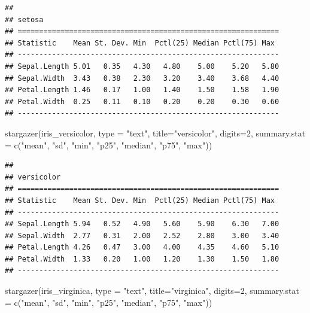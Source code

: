\documentclass[
]{book}
\newenvironment{Shaded}{\begin{snugshade}}{\end{snugshade}}
\newcommand{\AttributeTok}[1]{\textcolor[rgb]{0.77,0.63,0.00}{#1}}
\newcommand{\DecValTok}[1]{\textcolor[rgb]{0.00,0.00,0.81}{#1}}
\newcommand{\FunctionTok}[1]{\textcolor[rgb]{0.00,0.00,0.00}{#1}}
\newcommand{\NormalTok}[1]{#1}
\newcommand{\StringTok}[1]{\textcolor[rgb]{0.31,0.60,0.02}{#1}}
\begin{document}
\begin{verbatim}
## 
## setosa
## =============================================================
## Statistic    Mean St. Dev. Min  Pctl(25) Median Pctl(75) Max 
## -------------------------------------------------------------
## Sepal.Length 5.01   0.35   4.30   4.80    5.00    5.20   5.80
## Sepal.Width  3.43   0.38   2.30   3.20    3.40    3.68   4.40
## Petal.Length 1.46   0.17   1.00   1.40    1.50    1.58   1.90
## Petal.Width  0.25   0.11   0.10   0.20    0.20    0.30   0.60
## -------------------------------------------------------------
\end{verbatim}

\begin{Shaded}
\begin{Highlighting}[]
\FunctionTok{stargazer}\NormalTok{(iris\_versicolor, }\AttributeTok{type =} \StringTok{"text"}\NormalTok{, }\AttributeTok{title=}\StringTok{"versicolor"}\NormalTok{, }\AttributeTok{digits=}\DecValTok{2}\NormalTok{,}
          \AttributeTok{summary.stat =} \FunctionTok{c}\NormalTok{(}\StringTok{"mean"}\NormalTok{, }\StringTok{"sd"}\NormalTok{, }\StringTok{"min"}\NormalTok{, }\StringTok{"p25"}\NormalTok{, }\StringTok{"median"}\NormalTok{, }\StringTok{"p75"}\NormalTok{, }\StringTok{"max"}\NormalTok{))}
\end{Highlighting}
\end{Shaded}

\begin{verbatim}
## 
## versicolor
## =============================================================
## Statistic    Mean St. Dev. Min  Pctl(25) Median Pctl(75) Max 
## -------------------------------------------------------------
## Sepal.Length 5.94   0.52   4.90   5.60    5.90    6.30   7.00
## Sepal.Width  2.77   0.31   2.00   2.52    2.80    3.00   3.40
## Petal.Length 4.26   0.47   3.00   4.00    4.35    4.60   5.10
## Petal.Width  1.33   0.20   1.00   1.20    1.30    1.50   1.80
## -------------------------------------------------------------
\end{verbatim}

\begin{Shaded}
\begin{Highlighting}[]
\FunctionTok{stargazer}\NormalTok{(iris\_virginica, }\AttributeTok{type =} \StringTok{"text"}\NormalTok{, }\AttributeTok{title=}\StringTok{"virginica"}\NormalTok{, }\AttributeTok{digits=}\DecValTok{2}\NormalTok{,}
          \AttributeTok{summary.stat =} \FunctionTok{c}\NormalTok{(}\StringTok{"mean"}\NormalTok{, }\StringTok{"sd"}\NormalTok{, }\StringTok{"min"}\NormalTok{, }\StringTok{"p25"}\NormalTok{, }\StringTok{"median"}\NormalTok{, }\StringTok{"p75"}\NormalTok{, }\StringTok{"max"}\NormalTok{))}
\end{Highlighting}
\end{Shaded}
\end{document}
